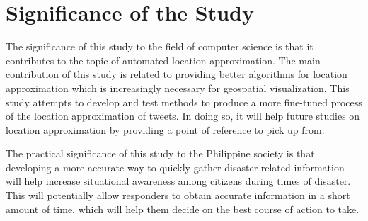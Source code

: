 \section{Significance of the Study}


The significance of this study to the field of computer science is that it contributes to the topic of automated location approximation. The main contribution of this study is related to providing better algorithms for location approximation which is increasingly necessary for geospatial visualization. This study attempts to develop and test methods to produce a more fine-tuned process of the location approximation of tweets. In doing so, it will help future studies on location approximation by providing a point of reference to pick up from. 

The practical significance of this study to the Philippine society is that developing a more accurate way to quickly gather disaster related information will help increase situational awareness among citizens during times of disaster. This will potentially allow responders to obtain accurate information in a short amount of time, which will help them decide on the best course of action to take. 